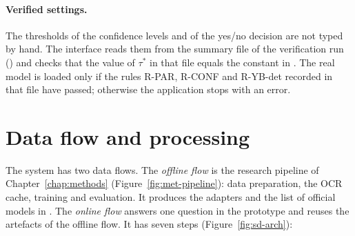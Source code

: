 \paragraph{Verified settings.} The thresholds of the confidence levels and of the yes/no
decision are not typed by hand. The interface reads them from the summary file of the
verification run ()
and checks that the value of $\tau^*$ in that file equals the constant in . The
real model is loaded only if the rules R-PAR, R-CONF and R-YB-det recorded in that file have
passed; otherwise the application stops with an error.

\section{Data flow and processing}
\label{sec:sd-flow}

The system has two data flows. The \emph{offline flow} is the research pipeline of
Chapter~\ref{chap:methods} (Figure~\ref{fig:met-pipeline}): data preparation, the OCR cache,
training and evaluation. It produces the adapters and the list of official models in
. The \emph{online flow} answers one question in the
prototype and reuses the artefacts of the offline flow. It has seven steps
(Figure~\ref{fig:sd-arch}):

